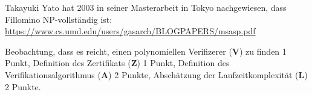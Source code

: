 \begin{diskussion}
Takayuki Yato hat 2003 in seiner Masterarbeit in Tokyo nachgewiesen,
dass Fillomino NP-vollständig ist:
\url{https://www.cs.umd.edu/users/gasarch/BLOGPAPERS/msasp.pdf}
\end{diskussion}

\begin{bewertung}
Beobachtung, dass es reicht, einen polynomiellen Verifizerer ({\bf V})
zu finden 1 Punkt,
Definition des Zertifikats ({\bf Z}) 1 Punkt,
Definition des Verifikationsalgorithmus ({\bf A}) 2 Punkte,
Abschätzung der Laufzeitkomplexität ({\bf L}) 2 Punkte.
\end{bewertung}

